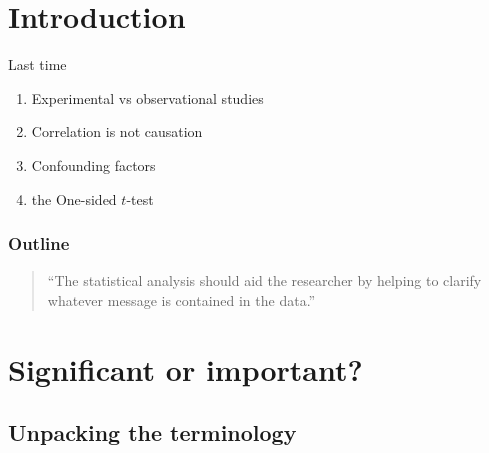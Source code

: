 

\subtitle{and hypothesis testing principles}

\date{22 October 2013}




\begin{frame}
  \maketitle
\end{frame}


\section*{Introduction}

\begin{frame}{Last time} 
  \begin{enumerate}
    \item Experimental vs observational studies
    \item Correlation is not causation
    \item Confounding factors
    \item the One-sided $t$-test
  \end{enumerate}
\end{frame}


\begin{frame}\frametitle<presentation>{Outline}
  \begin{quote}
    ``The statistical analysis should aid the researcher by helping to clarify whatever
    message is contained in the data.''
  \end{quote}
  \tableofcontents
\end{frame}


\section{Significant or important?}

\subsection{Unpacking the terminology}

